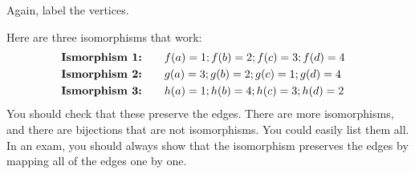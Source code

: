 \documentclass[a4paper, 12pt]{exam}
\begin{document}
\begin{questions}
  \begin{solution}
    Again, label the vertices.
      \begin{center}
        \hspace{1.5cm}
      \end{center}
      Here are three isomorphisms that work:
      \begin{align*}
      &\textbf{\textrm{Ismorphism 1:}} \qquad f(a) = 1; f(b) = 2; f(c) = 3; f(d) = 4& \\
      &\textbf{\textrm{Ismorphism 2:}} \qquad g(a) = 3; g(b) = 2; g(c) = 1; g(d) = 4& \\
      &\textbf{\textrm{Ismorphism 3:}} \qquad h(a) = 1; h(b) = 4; h(c) = 3; h(d) = 2&
      \end{align*}
      You should check that these preserve the edges.
      There are more isomorphisms, and there are bijections that are not isomorphisms.
      You could easily list them all.
      In an exam, you should always show that the isomorphism preserves the edges by mapping all of the edges one by one.
  \end{solution}



\end{questions}
\end{document}
